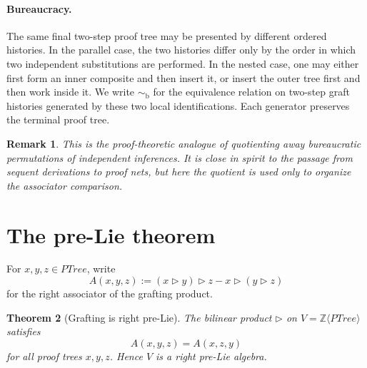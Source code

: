 \documentclass[11pt]{article}
\newtheorem{theorem}{Theorem}
\newtheorem{remark}[theorem]{Remark}
\newcommand{\PTree}{\mathit{PTree}}
\newcommand{\ZZ}{\mathbb{Z}}
\begin{document}
\paragraph{Bureaucracy.}
The same final two-step proof tree may be presented by different ordered
histories.  In the parallel case, the two histories differ only by the order
in which two independent substitutions are performed.  In the nested case,
one may either first form an inner composite and then insert it, or insert the
outer tree first and then work inside it.  We write \(\sim_{\mathrm b}\) for
the equivalence relation on two-step graft histories generated by these two
local identifications.  Each generator preserves the terminal proof tree.

\begin{remark}
This is the proof-theoretic analogue of quotienting away bureaucratic
permutations of independent inferences.  It is close in spirit to the passage
from sequent derivations to proof nets, but here the quotient is used only to
organize the associator comparison.
\end{remark}

\section{The pre-Lie theorem}

For \(x,y,z\in\PTree\), write
\[
A(x,y,z):=(x\triangleright y)\triangleright z
-x\triangleright (y\triangleright z)
\]
for the right associator of the grafting product.

\begin{theorem}[Grafting is right pre-Lie]\label{thm:prelie}
The bilinear product \(\triangleright\) on \(V=\ZZ\langle\PTree\rangle\)
satisfies
\[
A(x,y,z)=A(x,z,y)
\]
for all proof trees \(x,y,z\).  Hence \(V\) is a right pre-Lie algebra.
\end{theorem}
\end{document}
